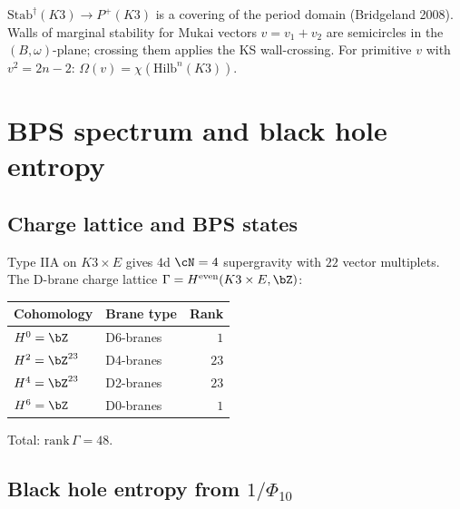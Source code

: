 \begin{remark}
\label{rem:bridgeland-k3}
$\mathrm{Stab}^\dagger(K3) \to P^+(K3)$ is a covering of the
period domain (Bridgeland 2008). Walls of marginal stability for
Mukai vectors $v = v_1 + v_2$ are semicircles in the
$(B,\omega)$-plane; crossing them applies the KS wall-crossing.
For primitive $v$ with $v^2 = 2n - 2$:
$\Omega(v) = \chi(\mathrm{Hilb}^n(K3))$.
\end{remark}



\section{BPS spectrum and black hole entropy}
\label{sec:bps-bh-k3xe}

\subsection{Charge lattice and BPS states}
\label{subsec:charge-lattice}

\begin{proposition}
\label{prop:charge-lattice}
Type IIA on $K3 \times E$ gives $4$d $\cN = 4$ supergravity
with $22$ vector multiplets. The D-brane charge lattice
$\Gamma = H^{\mathrm{even}}(K3 \times E, \bZ)$:
\begin{center}
\small
\renewcommand{\arraystretch}{1.2}
\begin{tabular}{llr}
\textbf{Cohomology} & \textbf{Brane type} & \textbf{Rank} \\
\hline
$H^0 = \bZ$ & D6-branes & $1$ \\
$H^2 = \bZ^{23}$ & D4-branes & $23$ \\
$H^4 = \bZ^{23}$ & D2-branes & $23$ \\
$H^6 = \bZ$ & D0-branes & $1$
\end{tabular}
\end{center}
Total: $\mathrm{rank}\,\Gamma = 48$.
\end{proposition}

\subsection{Black hole entropy from $1/\Phi_{10}$}
\label{subsec:bh-entropy}

